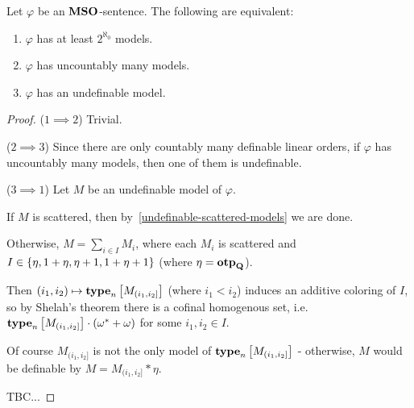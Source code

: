 \begin{theorem}\label{undefinable-models}
    Let $\varphi$ be an $\mathbf{MSO}$-sentence. The following are equivalent:
    \begin{enumerate}
        \item $\varphi$ has at least $2^{\aleph_0}$ models.
        \item $\varphi$ has uncountably many models.
        \item $\varphi$ has an undefinable model.
    \end{enumerate}
\end{theorem}

\begin{proof}
    ($1 \implies 2$) Trivial.

    ($2 \implies 3$) Since there are only countably many
    definable linear orders,
    if $\varphi$ has uncountably many models,
    then one of them is undefinable.

    ($3 \implies 1$)
    Let $M$ be an undefinable model of $\varphi$.

    If $M$ is scattered, then by~\cref{undefinable-scattered-models}
    we are done.

    Otherwise, $M = \sum_{i \in I} M_i$,
    where each $M_i$ is scattered and
    $I \in \left\{ {\eta, 1 + \eta, \eta + 1, 1 + \eta + 1} \right\}$
    (where $\eta = \mathbf{otp}_{\mathbf{Q}}$).

    Then $(i_1, i_2) \mapsto \mathbf{type}_{n} \left[ {M_{(i_1, i_2]}} \right]$ (where $i_1 < i_2$)
    induces an additive coloring of $I$, so by Shelah's theorem
    there is a cofinal homogenous set,
    i.e. $\mathbf{type}_{n} \left[ {M_{(i_1, i_2]}} \right] \cdot (\omega^\ast + \omega)$ for some
    $i_1, i_2 \in I$.

    Of course $M_{(i_1, i_2]}$ is not the only model of $\mathbf{type}_{n} \left[ {M_{(i_1, i_2]}} \right]$
    - otherwise, $M$ would be definable by $M = M_{(i_1, i_2]} * \eta$.

    TBC...
\end{proof}